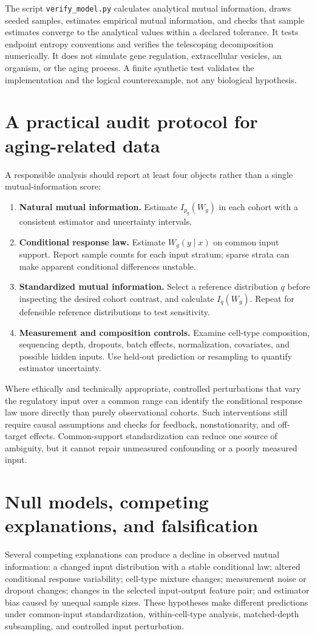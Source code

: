 \documentclass[11pt]{article}
\begin{document}
The script \texttt{verify\_model.py} calculates analytical mutual information, draws seeded samples, estimates empirical mutual information, and checks that sample estimates converge to the analytical values within a declared tolerance. It tests endpoint entropy conventions and verifies the telescoping decomposition numerically. It does not simulate gene regulation, extracellular vesicles, an organism, or the aging process. A finite synthetic test validates the implementation and the logical counterexample, not any biological hypothesis.

\section{A practical audit protocol for aging-related data}
A responsible analysis should report at least four objects rather than a single mutual-information score:
\begin{enumerate}
\item \textbf{Natural mutual information.} Estimate $I_{p_g}(W_g)$ in each cohort with a consistent estimator and uncertainty intervals.
\item \textbf{Conditional response law.} Estimate $W_g(y\mid x)$ on common input support. Report sample counts for each input stratum; sparse strata can make apparent conditional differences unstable.
\item \textbf{Standardized mutual information.} Select a reference distribution $q$ before inspecting the desired cohort contrast, and calculate $I_q(W_g)$. Repeat for defensible reference distributions to test sensitivity.
\item \textbf{Measurement and composition controls.} Examine cell-type composition, sequencing depth, dropouts, batch effects, normalization, covariates, and possible hidden inputs. Use held-out prediction or resampling to quantify estimator uncertainty.
\end{enumerate}

Where ethically and technically appropriate, controlled perturbations that vary the regulatory input over a common range can identify the conditional response law more directly than purely observational cohorts. Such interventions still require causal assumptions and checks for feedback, nonstationarity, and off-target effects. Common-support standardization can reduce one source of ambiguity, but it cannot repair unmeasured confounding or a poorly measured input.

\section{Null models, competing explanations, and falsification}
Several competing explanations can produce a decline in observed mutual information: a changed input distribution with a stable conditional law; altered conditional response variability; cell-type mixture changes; measurement noise or dropout changes; changes in the selected input-output feature pair; and estimator bias caused by unequal sample sizes. These hypotheses make different predictions under common-input standardization, within-cell-type analysis, matched-depth subsampling, and controlled input perturbation.
\end{document}
